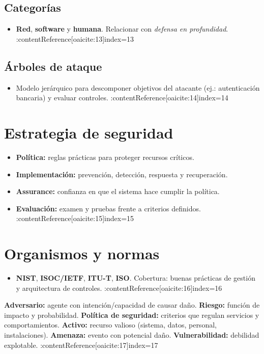 \documentclass[11pt,a4paper]{article}
\begin{document}
    \subsection{Categorías}
    \begin{itemize}
        \item \textbf{Red}, \textbf{software} y \textbf{humana}. Relacionar con \textit{defensa en profundidad}. :contentReference[oaicite:13]{index=13}
    \end{itemize}
    \subsection{Árboles de ataque}
    \begin{itemize}
        \item Modelo jerárquico para descomponer objetivos del atacante (ej.: autenticación bancaria) y evaluar controles. :contentReference[oaicite:14]{index=14}
    \end{itemize}

    \section{Estrategia de seguridad}
    \begin{itemize}
        \item \textbf{Política:} reglas prácticas para proteger recursos críticos.
        \item \textbf{Implementación:} prevención, detección, respuesta y recuperación.
        \item \textbf{Assurance:} confianza en que el sistema hace cumplir la política.
        \item \textbf{Evaluación:} examen y pruebas frente a criterios definidos. :contentReference[oaicite:15]{index=15}
    \end{itemize}

    \section{Organismos y normas}
    \begin{itemize}
        \item \textbf{NIST}, \textbf{ISOC/IETF}, \textbf{ITU-T}, \textbf{ISO}. Cobertura: buenas prácticas de gestión y arquitectura de controles. :contentReference[oaicite:16]{index=16}
    \end{itemize}

    \begin{VocabBox}
        \textbf{Adversario:} agente con intención/capacidad de causar daño. \;
        \textbf{Riesgo:} función de impacto y probabilidad. \;
        \textbf{Política de seguridad:} criterios que regulan servicios y comportamientos. \;
        \textbf{Activo:} recurso valioso (sistema, datos, personal, instalaciones). \;
        \textbf{Amenaza:} evento con potencial daño. \;
        \textbf{Vulnerabilidad:} debilidad explotable. :contentReference[oaicite:17]{index=17}
    \end{VocabBox}
\end{document}
